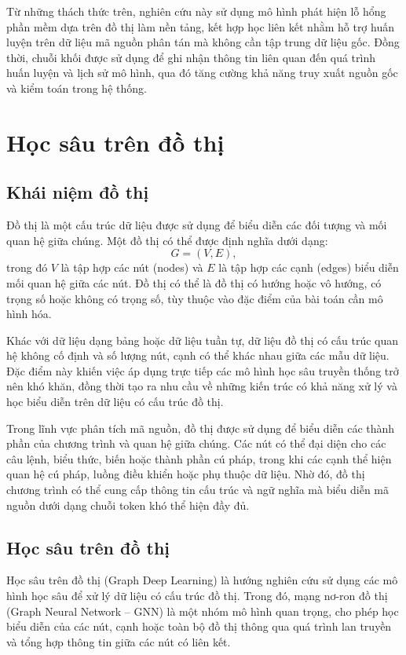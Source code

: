 Từ những thách thức trên, nghiên cứu này sử dụng mô hình phát hiện lỗ hổng phần mềm dựa trên đồ thị
làm nền tảng, kết hợp học liên kết nhằm hỗ trợ huấn luyện trên dữ liệu mã nguồn phân tán mà không
cần tập trung dữ liệu gốc. Đồng thời, chuỗi khối được sử dụng để ghi nhận thông tin liên quan đến
quá trình huấn luyện và lịch sử mô hình, qua đó tăng cường khả năng truy xuất nguồn gốc và kiểm
toán trong hệ thống.

\section{Học sâu trên đồ thị}

\subsection{Khái niệm đồ thị}

Đồ thị là một cấu trúc dữ liệu được sử dụng để biểu diễn các đối tượng và mối quan hệ giữa chúng. Một đồ thị có thể được định nghĩa dưới dạng:
\[
	G = (V, E),
\]
trong đó $V$ là tập hợp các nút (nodes) và $E$ là tập hợp các cạnh (edges) biểu diễn mối quan hệ
giữa các nút. Đồ thị có thể là đồ thị có hướng hoặc vô hướng, có trọng số hoặc không có trọng số,
tùy thuộc vào đặc điểm của bài toán cần mô hình hóa.

Khác với dữ liệu dạng bảng hoặc dữ liệu tuần tự, dữ liệu đồ thị có cấu trúc quan hệ không cố định
và số lượng nút, cạnh có thể khác nhau giữa các mẫu dữ liệu. Đặc điểm này khiến việc áp dụng trực
tiếp các mô hình học sâu truyền thống trở nên khó khăn, đồng thời tạo ra nhu cầu về những kiến trúc
có khả năng xử lý và học biểu diễn trên dữ liệu có cấu trúc đồ thị.

Trong lĩnh vực phân tích mã nguồn, đồ thị được sử dụng để biểu diễn các thành phần của chương trình
và quan hệ giữa chúng. Các nút có thể đại diện cho các câu lệnh, biểu thức, biến hoặc thành phần cú
pháp, trong khi các cạnh thể hiện quan hệ cú pháp, luồng điều khiển hoặc phụ thuộc dữ liệu. Nhờ đó,
đồ thị chương trình có thể cung cấp thông tin cấu trúc và ngữ nghĩa mà biểu diễn mã nguồn dưới dạng
chuỗi token khó thể hiện đầy đủ.

\subsection{Học sâu trên đồ thị}

Học sâu trên đồ thị (Graph Deep Learning) là hướng nghiên cứu sử dụng các mô hình học sâu để xử lý
dữ liệu có cấu trúc đồ thị. Trong đó, mạng nơ-ron đồ thị (Graph Neural Network -- GNN) là một nhóm
mô hình quan trọng, cho phép học biểu diễn của các nút, cạnh hoặc toàn bộ đồ thị thông qua quá
trình lan truyền và tổng hợp thông tin giữa các nút có liên kết.

